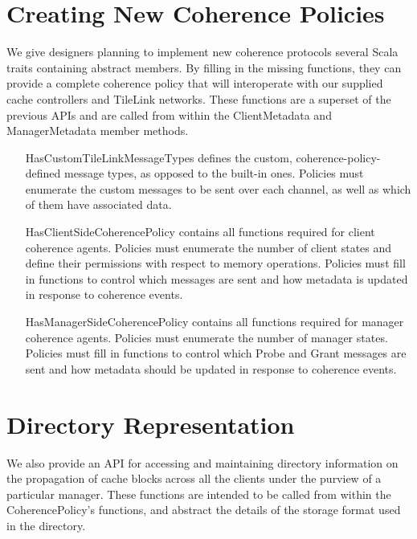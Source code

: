 \section{Creating New Coherence Policies}

We give designers planning to implement new coherence protocols several Scala traits
containing abstract members.
By filling in the missing functions, they can provide a complete coherence policy
that will interoperate with our supplied cache controllers and TileLink networks.
These functions are a superset of the previous APIs and are called from within the
ClientMetadata and ManagerMetadata member methods.

\begin{itemize}
\item[HasCustomTileLinkMessageTypes] defines the custom, coherence-policy-defined message types, as opposed to the built-in ones. Policies must enumerate the custom messages to be sent over each channel, as well as which of them have associated data.
\item[HasClientSideCoherencePolicy] contains all functions required for client coherence agents. Policies must enumerate the number of client states and define their permissions with respect to memory operations. Policies must fill in functions to control which messages are sent and how metadata is updated in response to coherence events.
\item[HasManagerSideCoherencePolicy] contains all functions required for manager coherence agents. Policies must enumerate the number of manager states. Policies must fill in functions to control which Probe and Grant messages are sent and how  metadata should be updated in response to coherence events.
\end{itemize}

\section{Directory Representation}

We also provide an API for accessing and maintaining directory information on the propagation of cache blocks across all the clients under the purview of a particular manager. These functions are intended to be called from within the CoherencePolicy’s functions, and abstract the details of the storage format used in the directory.

